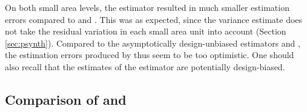On both small area levels, the \psynth{} estimator resulted in much smaller estimation errors compared to \psmall{} and \extpsynth{}. This was as expected, since the \psynth{} variance estimate does not take the residual variation in each small area unit into account (Section \ref{sec:psynth}). Compared to the asymptotically design-unbiased estimators \psmall{} and \extpsynth{}, the estimation errors produced by \psynth{} thus seem to be too optimistic. One should also recall that the estimates of the \psynth{} estimator are potentially design-biased.





\subsection{Comparison of \psmall{} and \extpsynth{}}
\label{sec:comp}

